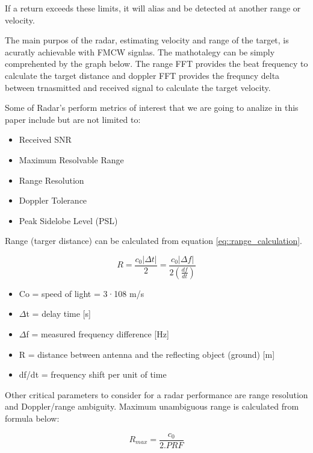 \documentclass[conference]{IEEEtran}
\begin{document}
	If a return exceeds these limits, it will alias and be detected at another range or velocity.
	
The main purpos of the radar, estimating velocity and range of the target, is acuratly achievable with FMCW signlas. The mathotalegy can be simply comprehented by the graph below. The range FFT provides the beat frequency to calculate the target distance and doppler FFT provides the frequncy delta between trnasmitted and received signal to calculate the target velocity. 
	

Some of Radar's perform metrics of interest that we are going to analize in this paper include but are not limited to:

\begin{itemize}
\item Received SNR
\item Maximum Resolvable Range
\item Range Resolution
\item Doppler Tolerance
\item Peak Sidelobe Level (PSL)
\end{itemize}

	Range (targer distance) can be calculated from equation \ref{eq::range_calculation}. %
	
	\begin{equation}
		R = \frac{c_0|{\Delta}t|}{2} = \frac{c_0|{\Delta}f|}{2\left(\frac{df}{dt}\right)}
		\label{eq::range_calculation}
	\end{equation}
	
	\begin{itemize}
	\item Co = speed of light = 3·108 m/s
	\item \(\Delta \)t = delay time [s]
	\item \(\Delta \)f = measured frequency difference [Hz]
	\item R = distance between antenna and the reflecting object (ground) [m]
	\item df/dt = frequency shift per unit of time
	\end{itemize}

Other critical parameters to consider for a radar performance are range resolution and Doppler/range ambiguity. 
Maximum unambiguous range is calculated from formula below:

	\begin{equation}
		R_{max} = \frac{c_0}{2.PRF}
		\label{eq:: range ambiguity_calculation}
	\end{equation}
\end{document}
